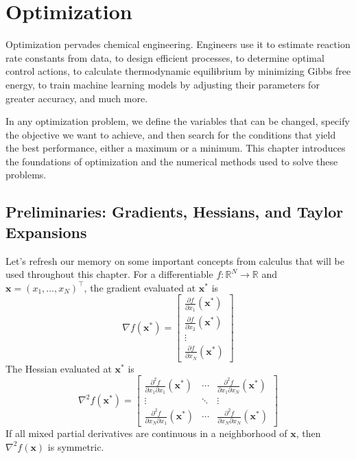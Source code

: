 \chapter{Optimization}

Optimization pervades chemical engineering. Engineers use it to estimate reaction rate constants from data, to design efficient processes, to determine optimal control actions, to calculate thermodynamic equilibrium by minimizing Gibbs free energy, to train machine learning models by adjusting their parameters for greater accuracy, and much more.

In any optimization problem, we define the variables that can be changed, specify the objective we want to achieve, and then search for the conditions that yield the best performance, either a maximum or a minimum. This chapter introduces the foundations of optimization and the numerical methods used to solve these problems.

\section{Preliminaries: Gradients, Hessians, and Taylor Expansions}
Let's refresh our memory on some important concepts from calculus that will be used throughout this chapter. For a differentiable $f: \mathbb{R}^N \to \mathbb{R}$ and $\mathbf{x} = (x_1,\dots,x_N)^\top$, the gradient evaluated at $\mathbf{x}^*$ is
\begin{equation}
    \renewcommand{\arraystretch}{1.5}
    \nabla f(\mathbf{x}^*) = \begin{bmatrix}
        \frac{\partial f}{\partial x_1}(\mathbf{x}^*) \\
        \frac{\partial f}{\partial x_2}(\mathbf{x}^*) \\
        \vdots \\
        \frac{\partial f}{\partial x_N}(\mathbf{x}^*)
    \end{bmatrix}
    \end{equation}
The Hessian evaluated at $\mathbf{x}^*$ is
\begin{equation}
    \renewcommand{\arraystretch}{1.5}
    \nabla^2 f(\mathbf{x}^*) = \begin{bmatrix}
        \frac{\partial^2 f}{\partial x_1\partial x_1}(\mathbf{x}^*) & \cdots & \frac{\partial^2 f}{\partial x_1\partial x_N}(\mathbf{x}^*) \\
        \vdots & \ddots & \vdots \\
        \frac{\partial^2 f}{\partial x_N\partial x_1}(\mathbf{x}^*) & \cdots & \frac{\partial^2 f}{\partial x_N\partial x_N}(\mathbf{x}^*)
    \end{bmatrix}
\end{equation}
If all mixed partial derivatives are continuous in a neighborhood of $\mathbf{x}$, then $\nabla^2 f(\mathbf{x})$ is symmetric.

